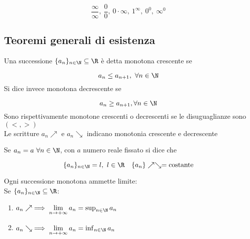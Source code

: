\documentclass[../appunti.tex]{subfiles}
\begin{document}
\begin{equation} 
	\frac{\infty}{\infty},\  \frac{0}{0},\ 
	0 \cdot \infty,\ 1^{\infty},\
	0^0,\ \infty^0
\end{equation}

\subsection{Teoremi generali di esistenza}
Una successione $\{ a_n \}_{n \in \N} \subseteq \R$ è detta monotona crescente se 


\begin{equation}
	a_n \leq a_{ n + 1 },\  \forall n \in \N 
\end{equation}
Si dice invece monotona decrescente se


\begin{equation}
	a_n \geq a_{ n + 1}, \forall n \in \N
\end{equation}
Sono rispettivamente  monotone crescenti o decrescenti 
se le disuguaglianze sono  $ ( <, >) $\\
Le scritture $ a_n \nearrow$ e $ a_n \searrow $ indicano monotonia crescente e decrescente  

\begin{defn}
Se $ a_n = a \ \forall n \in \N$, con $a$ numero reale fissato si dice che 


\begin{equation}
	\{ a_n \}_{n \in \N} = l,\ l \in \R \quad 
	\{ a_n \} \nearrow \searrow = \mbox{costante}
\end{equation}

\end{defn}

\begin{defn}
Ogni successione monotona ammette limite: \\
Se $ \{ a_n \}_{n \in \N} \subseteq \R $:

\begin{enumerate}
	\item $ a_n \nearrow \implies \lim \limits_{n \to + \infty} a_n = 
	\sup_{n \in \N} a_n$
	\item $ a_n \searrow \implies \lim \limits_{n \to + \infty} a_n =
	\inf_{n \in \N} a_n $
\end{enumerate}
\end{defn}
\end{document}
